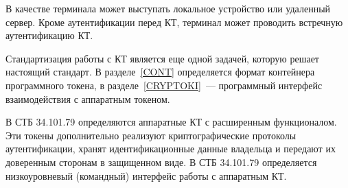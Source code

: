 В качестве терминала может выступать локальное устройство или удаленный 
сервер. Кроме аутентификации перед КТ, терминал может проводить встречную  
аутентификацию КТ. 

Стандартизация работы с КТ является еще одной задачей, которую решает 
настоящий стандарт. В разделе~\ref{CONT} определяется формат контейнера 
программного токена, в разделе~\ref{CRYPTOKI}~--- программный интерфейс
взаимодействия с аппаратным токеном. 

В СТБ 34.101.79 определяются аппаратные КТ с расширенным функционалом.
Эти токены дополнительно реализуют криптографические протоколы 
аутентификации, хранят идентификационные данные владельца и передают их 
доверенным сторонам в защищенном виде.
%
В СТБ 34.101.79 определяется низкоуровневый (командный) интерфейс работы 
с аппаратным КТ.


